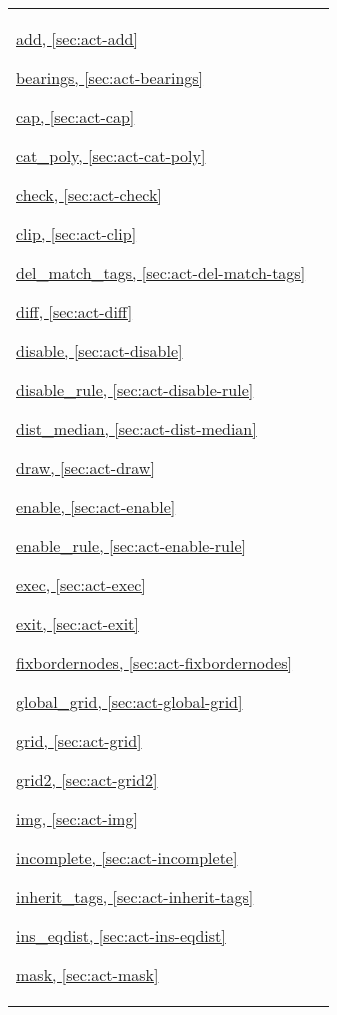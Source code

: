 \noindent\begin{tabular}{p{}p{}}
\hyperref[sec:act-add]{add, \ref*{sec:act-add}}

\hyperref[sec:act-bearings]{bearings, \ref*{sec:act-bearings}}

\hyperref[sec:act-cap]{cap, \ref*{sec:act-cap}}

\hyperref[sec:act-cat-poly]{cat\_poly, \ref*{sec:act-cat-poly}}

\hyperref[sec:act-check]{check, \ref*{sec:act-check}}

\hyperref[sec:act-clip]{clip, \ref*{sec:act-clip}}

\hyperref[sec:act-del-match-tags]{del\_match\_tags, \ref*{sec:act-del-match-tags}}

\hyperref[sec:act-diff]{diff, \ref*{sec:act-diff}}

\hyperref[sec:act-disable]{disable, \ref*{sec:act-disable}}

\hyperref[sec:act-disable-rule]{disable\_rule, \ref*{sec:act-disable-rule}}

\hyperref[sec:act-dist-median]{dist\_median, \ref*{sec:act-dist-median}}

\hyperref[sec:act-draw]{draw, \ref*{sec:act-draw}}

\hyperref[sec:act-enable]{enable, \ref*{sec:act-enable}}

\hyperref[sec:act-enable-rule]{enable\_rule, \ref*{sec:act-enable-rule}}

\hyperref[sec:act-exec]{exec, \ref*{sec:act-exec}}

\hyperref[sec:act-exit]{exit, \ref*{sec:act-exit}}

\hyperref[sec:act-fixbordernodes]{fixbordernodes, \ref*{sec:act-fixbordernodes}}

\hyperref[sec:act-global-grid]{global\_grid, \ref*{sec:act-global-grid}}

\hyperref[sec:act-grid]{grid, \ref*{sec:act-grid}}

\hyperref[sec:act-grid2]{grid2, \ref*{sec:act-grid2}}

\hyperref[sec:act-img]{img, \ref*{sec:act-img}}

\hyperref[sec:act-incomplete]{incomplete, \ref*{sec:act-incomplete}}

\hyperref[sec:act-inherit-tags]{inherit\_tags, \ref*{sec:act-inherit-tags}}

\hyperref[sec:act-ins-eqdist]{ins\_eqdist, \ref*{sec:act-ins-eqdist}}

\hyperref[sec:act-mask]{mask, \ref*{sec:act-mask}}


\end{tabular}
